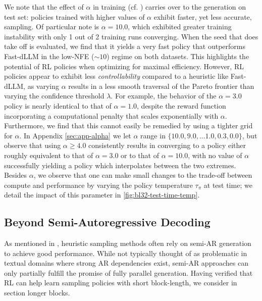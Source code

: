 We note that the effect of $\alpha$ in training (cf. ) carries over to the generation on test set: policies trained with higher values of $\alpha$ exhibit faster, yet less accurate, sampling.
Of particular note is $\alpha=10.0$, which exhibited greater training instability with only 1 out of 2 training runs converging. When the seed that does take off is evaluated,
we find that it yields a very fast policy that outperforms Fast-dLLM in the low-NFE ($\sim10$) regime on both datasets. This highlights the potential of RL policies when optimizing for maximal efficiency. However, RL policies appear to exhibit less \emph{controllability} compared to a heuristic like Fast-dLLM, as varying $\alpha$ results in a less smooth traversal of the Pareto frontier than varying the confidence threshold $\lambda$.
For example, the behavior of the $\alpha = 3.0$ policy is nearly identical to that of $\alpha = 1.0$, despite the reward function incorporating a computational penalty that scales exponentially with $\alpha$.
Furthermore, we find that this cannot easily be remedied by using a tighter grid for $\alpha$.
In Appendix \ref{sec:app-alpha} we let $\alpha$ range in $ 
\{10.0, 9.0, ... 1.0, 0.3, 0.0\}$,
but observe that using $\alpha \geq 4.0$ consistently results in converging to a policy either roughly equivalent to that of $\alpha=3.0$ or to that of $\alpha=10.0$, with no value of $\alpha$ successfully yielding a policy which interpolates between the two extremes.
Besides $\alpha$, we observe that one can make small changes to the trade-off between compute and performance by varying the policy temperature $\tau_{\pi}$ at test time; we detail the impact of this parameter in \autoref{fig:bl32-test-time-temp}. %

\subsection{Beyond Semi-Autoregressive Decoding}
\label{sec:exp-bl256}
As mentioned in , heuristic sampling methods often rely on semi-AR generation to achieve good performance. While not typically thought of as problematic in textual domains where strong AR dependencies exist, semi-AR approaches can only partially fulfill the promise of fully parallel generation.
Having verified that RL can help learn sampling policies with short block-length, we consider in section longer blocks.


